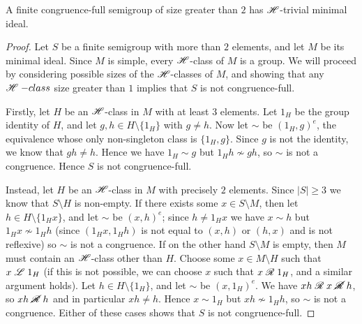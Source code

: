 \begin{lemma}
  \label{lem:m-is-h-trivial}
  A finite congruence-full semigroup of size greater than $2$ has $\mathrel{\mathscr{H}}$-trivial
  minimal ideal.
  \begin{proof}
    Let $S$ be a finite semigroup with more than $2$ elements,
    and let $M$ be its minimal ideal.  Since $M$ is simple, every $\mathrel{\mathscr{H}}$-class of
    $M$ is a group.  We will proceed by considering possible sizes of the
    $\mathrel{\mathscr{H}}$-classes of $M$, and showing that any $\mathrel{\mathscr{H}}-class$ size greater than $1$
    implies that $S$ is not congruence-full.

    Firstly, let $H$ be an $\mathrel{\mathscr{H}}$-class in $M$ with at least $3$ elements.  Let
    $1_H$ be the group identity of $H$, and let $g,h \in H\setminus\{1_H\}$ with
    $g \neq h$.  Now let $\sim$ be $(1_H, g)^e$, the equivalence whose only
    non-singleton class is $\{1_H,g\}$.  Since $g$ is not the identity, we know
    that $gh \neq h$.  Hence we have $1_H \sim g$ but $1_H h \nsim gh$, so
    $\sim$ is not a congruence.  Hence $S$ is not congruence-full.

    Instead, let $H$ be an $\mathrel{\mathscr{H}}$-class in $M$ with precisely $2$ elements.
    Since $|S| \geq 3$ we know that $S \setminus H$ is non-empty.  If there
    exists some $x \in S \setminus M$, then let $h \in H \setminus \{1_H x\}$,
    and let $\sim$ be $(x,h)^e$; since $h \neq 1_H x$ we have $x \sim h$ but
    $1_H x \nsim 1_H h$ (since $(1_Hx, 1_Hh)$ is not equal to $(x,h)$ or $(h,x)$
    and is not reflexive) so $\sim$ is not a congruence.  If on the other hand
    $S \setminus M$ is empty, then $M$ must contain an $\mathrel{\mathscr{H}}$-class other than
    $H$.  Choose some $x \in M \setminus H$ such that $x \mathrel{\mathscr{L}} 1_H$ (if this is
    not possible, we can choose $x$ such that $x \mathrel{\mathscr{R}} 1_H$, and a similar
    argument holds).  Let $h \in H \setminus \{1_H\}$, and let $\sim$ be
    $(x,1_H)^e$.  We have $xh \mathrel{\mathscr{R}} x \mathrel{\cancel{\mathscr{R}}} h$, so $xh \mathrel{\cancel{\mathscr{R}}} h$ and in particular
    $xh \neq h$.  Hence $x \sim 1_H$ but $xh \nsim 1_H h$, so $\sim$ is not a
    congruence.  Either of these cases shows that $S$ is not congruence-full.
  \end{proof}
\end{lemma}

